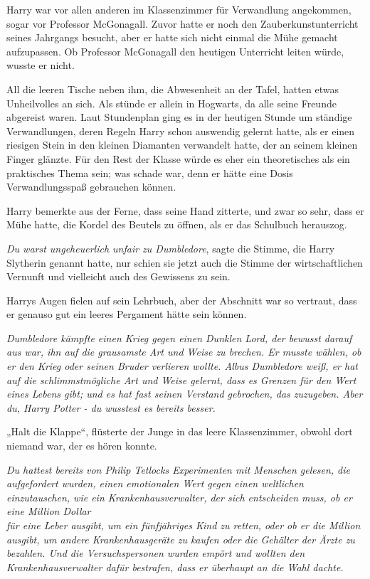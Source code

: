 {Harry war vor allen anderen im Klassenzimmer für Verwandlung angekommen, sogar vor Professor McGonagall. Zuvor hatte er noch den Zauberkunstunterricht seines Jahrgangs besucht, aber er hatte sich nicht einmal die Mühe gemacht aufzupassen. Ob Professor McGonagall den heutigen Unterricht leiten würde, wusste er nicht.

All die leeren Tische neben ihm, die Abwesenheit an der Tafel, hatten etwas Unheilvolles an sich. Als stünde er allein in Hogwarts, da alle seine Freunde abgereist waren. Laut Stundenplan ging es in der heutigen Stunde um ständige Verwandlungen, deren Regeln Harry schon auswendig gelernt hatte, als er einen riesigen Stein in den kleinen Diamanten verwandelt hatte, der an seinem kleinen Finger glänzte. Für den Rest der Klasse würde es eher ein theoretisches als ein praktisches Thema sein; was schade war, denn er hätte eine Dosis Verwandlungsspaß gebrauchen können.

Harry bemerkte aus der Ferne, dass seine Hand zitterte, und zwar so sehr, dass er Mühe hatte, die Kordel des Beutels zu öffnen, als er das Schulbuch herauszog.

\emph{Du warst ungeheuerlich unfair zu Dumbledore}, sagte die Stimme, die Harry Slytherin genannt hatte, nur schien sie jetzt auch die Stimme der wirtschaftlichen Vernunft und vielleicht auch des Gewissens zu sein.

Harrys Augen fielen auf sein Lehrbuch, aber der Abschnitt war so vertraut, dass er genauso gut ein leeres Pergament hätte sein können.

\emph{Dumbledore kämpfte einen Krieg gegen einen Dunklen Lord, der bewusst darauf aus war, ihn auf die grausamste Art und Weise zu brechen. Er musste wählen, ob er den Krieg oder seinen Bruder verlieren wollte. Albus Dumbledore weiß, er hat auf die schlimmstmögliche Art und Weise gelernt, dass es Grenzen für den Wert eines Lebens gibt; und es hat fast seinen Verstand gebrochen, das zuzugeben. Aber du, Harry Potter - du wusstest es bereits besser.}

„Halt die Klappe“, flüsterte der Junge in das leere Klassenzimmer, obwohl dort niemand war, der es hören konnte.

\emph{Du hattest bereits von Philip Tetlocks Experimenten mit Menschen gelesen, die aufgefordert wurden, einen emotionalen Wert gegen einen weltlichen einzutauschen, wie ein Krankenhausverwalter, der sich entscheiden muss, ob er eine Million Dollar}\\ \emph{für eine Leber ausgibt, um ein fünfjähriges Kind zu retten, oder ob er die Million ausgibt, um andere Krankenhausgeräte zu kaufen oder die Gehälter der Ärzte zu bezahlen. Und die Versuchspersonen wurden empört und wollten den Krankenhausverwalter dafür bestrafen, dass er überhaupt an die Wahl dachte.}

}
